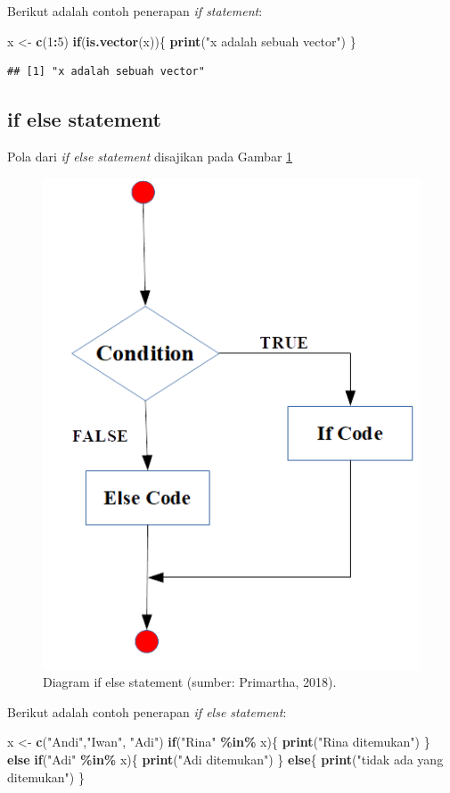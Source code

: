\documentclass[
]{book}
\newenvironment{Shaded}{\begin{snugshade}}{\end{snugshade}}
\newcommand{\ControlFlowTok}[1]{\textcolor[rgb]{0.13,0.29,0.53}{\textbf{#1}}}
\newcommand{\DecValTok}[1]{\textcolor[rgb]{0.00,0.00,0.81}{#1}}
\newcommand{\FunctionTok}[1]{\textcolor[rgb]{0.13,0.29,0.53}{\textbf{#1}}}
\newcommand{\NormalTok}[1]{#1}
\newcommand{\OtherTok}[1]{\textcolor[rgb]{0.56,0.35,0.01}{#1}}
\newcommand{\SpecialCharTok}[1]{\textcolor[rgb]{0.81,0.36,0.00}{\textbf{#1}}}
\newcommand{\StringTok}[1]{\textcolor[rgb]{0.31,0.60,0.02}{#1}}
\theoremstyle{definition}
\theoremstyle{definition}
\theoremstyle{definition}
\theoremstyle{definition}
\theoremstyle{remark}
\begin{document}
Berikut adalah contoh penerapan \emph{if statement}:

\begin{Shaded}
\begin{Highlighting}[]
\NormalTok{x }\OtherTok{\textless{}{-}} \FunctionTok{c}\NormalTok{(}\DecValTok{1}\SpecialCharTok{:}\DecValTok{5}\NormalTok{)}
\ControlFlowTok{if}\NormalTok{(}\FunctionTok{is.vector}\NormalTok{(x))\{}
  \FunctionTok{print}\NormalTok{(}\StringTok{"x adalah sebuah vector"}\NormalTok{)}
\NormalTok{\}}
\end{Highlighting}
\end{Shaded}

\begin{verbatim}
## [1] "x adalah sebuah vector"
\end{verbatim}

\hypertarget{ifelsestatement}{%
\subsection{if else statement}\label{ifelsestatement}}

Pola dari \emph{if else statement} disajikan pada Gambar \ref{fig:ifelse}

\begin{figure}

{\centering \includegraphics[width=0.4\linewidth]{./images/ifelse} 

}

\caption{Diagram if else statement (sumber: Primartha, 2018).}\label{fig:ifelse}
\end{figure}

Berikut adalah contoh penerapan \emph{if else statement}:

\begin{Shaded}
\begin{Highlighting}[]
\NormalTok{x }\OtherTok{\textless{}{-}} \FunctionTok{c}\NormalTok{(}\StringTok{"Andi"}\NormalTok{,}\StringTok{"Iwan"}\NormalTok{, }\StringTok{"Adi"}\NormalTok{)}
\ControlFlowTok{if}\NormalTok{(}\StringTok{"Rina"} \SpecialCharTok{\%in\%}\NormalTok{ x)\{}
  \FunctionTok{print}\NormalTok{(}\StringTok{"Rina ditemukan"}\NormalTok{)}
\NormalTok{\} }\ControlFlowTok{else} \ControlFlowTok{if}\NormalTok{(}\StringTok{"Adi"} \SpecialCharTok{\%in\%}\NormalTok{ x)\{}
  \FunctionTok{print}\NormalTok{(}\StringTok{"Adi ditemukan"}\NormalTok{)}
\NormalTok{\} }\ControlFlowTok{else}\NormalTok{\{}
  \FunctionTok{print}\NormalTok{(}\StringTok{"tidak ada yang ditemukan"}\NormalTok{)}
\NormalTok{\}}
\end{Highlighting}
\end{Shaded}
\end{document}
